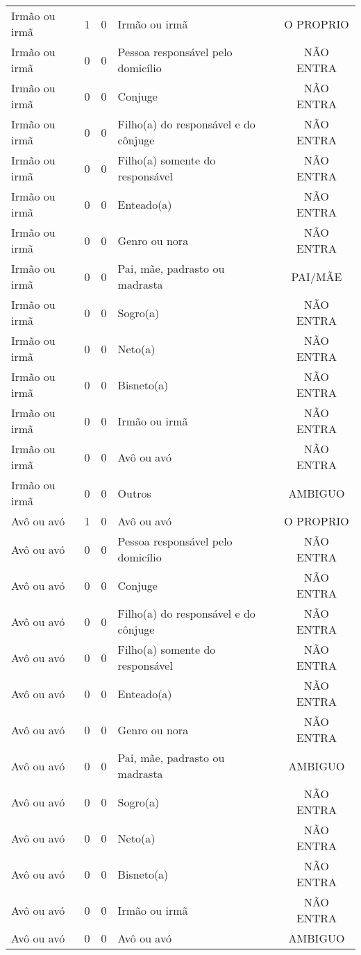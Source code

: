 \documentclass[
	12pt,				%
	openright,			%
	twoside,			%
	a4paper,			%
	english,			%
	french,				%
	spanish,			%
	brazil				%
	]{abntex2}
\begin{document}
\begin{anexosenv}
\begin{longtable}{@{}lcclc@{}}
				Irmão ou irmã & 1 & 0 & Irmão ou irmã & O PROPRIO \\
				Irmão ou irmã & 0 & 0 & Pessoa responsável pelo domicílio & NÃO ENTRA \\
				Irmão ou irmã & 0 & 0 & Conjuge & NÃO ENTRA \\
				Irmão ou irmã & 0 & 0 & Filho(a) do responsável e do cônjuge & NÃO ENTRA \\
				Irmão ou irmã & 0 & 0 & Filho(a) somente do responsável & NÃO ENTRA \\
				Irmão ou irmã & 0 & 0 & Enteado(a) & NÃO ENTRA \\
				Irmão ou irmã & 0 & 0 & Genro ou nora & NÃO ENTRA \\
				Irmão ou irmã & 0 & 0 & Pai, mãe, padrasto ou madrasta & PAI/MÃE \\
				Irmão ou irmã & 0 & 0 & Sogro(a) & NÃO ENTRA \\
				Irmão ou irmã & 0 & 0 & Neto(a) & NÃO ENTRA \\
				Irmão ou irmã & 0 & 0 & Bisneto(a) & NÃO ENTRA \\
				Irmão ou irmã & 0 & 0 & Irmão ou irmã & NÃO ENTRA \\
				Irmão ou irmã & 0 & 0 & Avô ou avó & NÃO ENTRA \\
				Irmão ou irmã & 0 & 0 & Outros & AMBIGUO \\
				Avô ou avó & 1 & 0 & Avô ou avó & O PROPRIO \\
				Avô ou avó & 0 & 0 & Pessoa responsável pelo domicílio & NÃO ENTRA \\
				Avô ou avó & 0 & 0 & Conjuge & NÃO ENTRA \\
				Avô ou avó & 0 & 0 & Filho(a) do responsável e do cônjuge & NÃO ENTRA \\
				Avô ou avó & 0 & 0 & Filho(a) somente do responsável & NÃO ENTRA \\
				Avô ou avó & 0 & 0 & Enteado(a) & NÃO ENTRA \\
				Avô ou avó & 0 & 0 & Genro ou nora & NÃO ENTRA \\
				Avô ou avó & 0 & 0 & Pai, mãe, padrasto ou madrasta & AMBIGUO \\
				Avô ou avó & 0 & 0 & Sogro(a) & NÃO ENTRA \\
				Avô ou avó & 0 & 0 & Neto(a) & NÃO ENTRA \\
				Avô ou avó & 0 & 0 & Bisneto(a) & NÃO ENTRA \\
				Avô ou avó & 0 & 0 & Irmão ou irmã & NÃO ENTRA \\
				Avô ou avó & 0 & 0 & Avô ou avó & AMBIGUO \\

\end{longtable}
\end{anexosenv}
\end{document}
